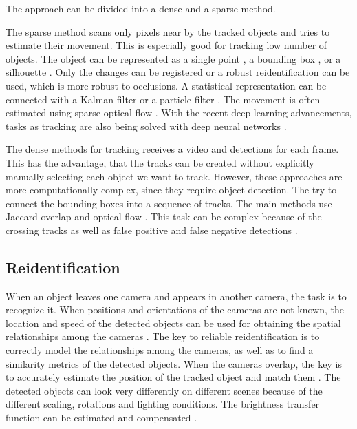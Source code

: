 \documentclass[a4paper,12pt,titlepage, twoside]{article}
\numberwithin{figure}{section}
\begin{document}
The approach can be divided into a dense and a sparse method. 

The sparse method scans only pixels near by the tracked objects and tries to estimate their movement. This is especially good for tracking low number of objects. The object can be represented as a single point \cite{kale2015moving}, a bounding box \cite{comaniciu2003kernel, porikli2005multi, yilmaz2007object, elgammal2002background}, or a silhouette \cite{isard2001bramble}. Only the changes can be registered \cite{kale2015moving} or a robust reidentification \cite{veenman1998fast} can be used, which is more robust to occlusions. A statistical representation can be connected with a Kalman filter \cite{banerjee2008multi} or a particle filter \cite{zhong2012moving}. The movement is often estimated using sparse optical flow \cite{kale2015moving, mae1996object}. With the recent deep learning advancements, tasks as tracking are also being solved with deep neural networks \cite{bertinetto2016fully, held2016learning, gladh2016deep, gaidon2016virtual, lee2016globally}.

The dense methods for tracking receives a video and detections for each frame. This has the advantage, that the tracks can be created without explicitly manually selecting each object we want to track. However, these approaches are more computationally complex, since they require object detection. The try to connect the bounding boxes into a sequence of tracks. The main methods use Jaccard overlap \cite{tan2005introduction, benfold2011stable} and optical flow \cite{chen2011tracking}. This task can be complex because of the crossing tracks as well as false positive and false negative detections \cite{joshi2012survey, elgammal2002background}.



\subsection{Reidentification}
When an object leaves one camera and appears in another camera, the task is to recognize it. When positions and orientations of the cameras are not known, the location and speed of the detected objects can be used for obtaining the spatial relationships among the cameras \cite{makris2004bridging}. The key to reliable reidentification is to correctly model the relationships among the cameras, as well as to find a similarity metrics of the detected objects. When the cameras overlap, the key is to accurately estimate the position of the tracked object and match them \cite{khan2003consistent, krumm2000multi, zhao2005real}. The detected objects can look very differently on different scenes because of the different scaling, rotations and lighting conditions. The brightness transfer function can be estimated and compensated \cite{javed2005appearance, porikli2003inter}. 
\end{document}
